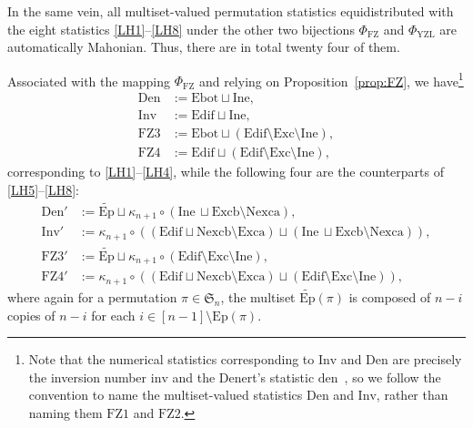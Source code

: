 \documentclass[12pt]{amsart}
\numberwithin{equation}{section}
\theoremstyle{plain}
\theoremstyle{definition}
\def\FZ{\mathrm{FZ}}
\def\YZL{\mathrm{YZL}}
\def\SS{\mathfrak{S}}
\def\Edif{\mathrm{Edif}}
\def\Excp{\mathrm{Ep}}
\def\Exc{\mathrm{Exc}}
\def\Nexcb{\mathrm{Nexcb}}
\def\Nexca{\mathrm{Nexca}}
\def\Excb{\mathrm{Excb}}
\def\Exca{\mathrm{Exca}}
\def\Ine{\mathrm{Ine}}
\def\Ebot{\mathrm{Ebot}}
\def\Inv{\mathrm{Inv}}
\def\Den{\mathrm{Den}}
\def\FZthree{\mathrm{FZ3}}
\def\FZfour{\mathrm{FZ4}}
\def\inv{\mathrm{inv}}
\def\den{\mathrm{den}}
\def\inv{\mathrm{inv}}
\begin{document}
In the same vein, all multiset-valued permutation statistics equidistributed with the eight statistics \eqref{LH1}--\eqref{LH8} under the other two bijections $\Phi_{\FZ}$ and $\Phi_{\YZL}$ are automatically Mahonian. Thus, there are in total twenty four of them.

Associated with the mapping $\Phi_{\FZ}$ and relying on Proposition~\ref{prop:FZ}, we have\footnote{Note that the numerical statistics corresponding to $\Inv$ and $\Den$ are precisely the inversion number $\inv$ and the Denert's statistic $\den$~\cite{FZ90}, so we follow the convention to name the multiset-valued statistics $\Den$ and $\Inv$, rather than naming them $\FZ1$ and $\FZ2$.}
\begin{align*}
  \Den & :=\Ebot \sqcup \Ine, \\
  \Inv & :=\Edif \sqcup \Ine,\\
  \FZthree & :=\Ebot \sqcup
  (\Edif \setminus \Exc \setminus \Ine), \\
  \FZfour & :=\Edif \sqcup (\Edif \setminus \Exc \setminus \Ine),
\end{align*}
corresponding to \eqref{LH1}--\eqref{LH4}, while the following four are the counterparts of \eqref{LH5}--\eqref{LH8}:
\begin{align*}
\Den'& :=\widetilde{\Excp }\sqcup\kappa_{n+1}\circ(\Ine \, \sqcup  \Excb \setminus\Nexca),\\
\Inv'& :=\kappa_{n+1}\circ((\Edif \sqcup \Nexcb \setminus \Exca) \sqcup(\Ine \, \sqcup  \Excb \setminus\Nexca)),  \\
\FZthree'& :=\widetilde{\Excp  } \sqcup \kappa_{n+1}\circ(\Edif\setminus \Exc \setminus \Ine),\\
\FZfour'& :=\kappa_{n+1}\circ((\Edif \sqcup \Nexcb \setminus \Exca) \sqcup   (\Edif\setminus \Exc \setminus \Ine)),
\end{align*}
where again for a permutation $\pi\in\SS_n$, the multiset $\widetilde{\Excp}(\pi)$ is composed of $n-i$ copies of $n-i$ for each $i\in[n-1]\setminus\Excp(\pi)$.
\end{document}
